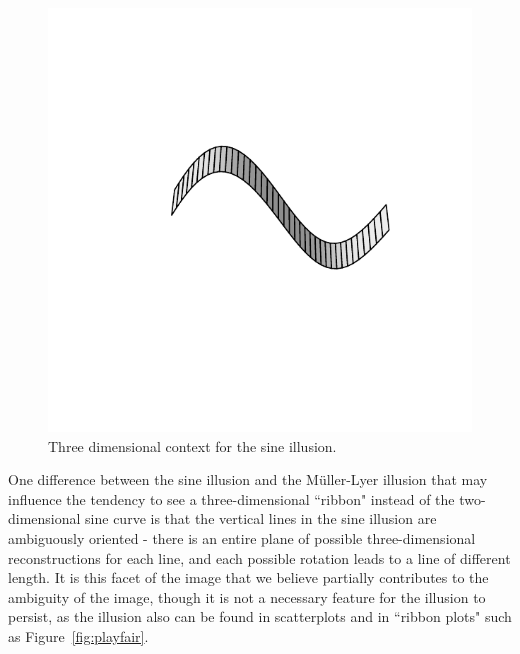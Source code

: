 \documentclass[journal]{vgtc}\usepackage{graphicx, color}
\begin{document}
\begin{figure}[h!t]\centering
\includegraphics[keepaspectratio=TRUE,width=\linewidth, trim=0in 1.5in 0in 1.5in]{figure/fig-sinedemo2}
\caption{Three dimensional context for the sine illusion.}\label{fig:sineillusion3d}
\end{figure}

One difference between the sine illusion and the M\"uller-Lyer illusion that may influence the tendency to see a three-dimensional ``ribbon" instead of the two-dimensional sine curve is that the vertical lines in the sine illusion are ambiguously oriented - there is an entire plane of possible three-dimensional reconstructions for each line, and each possible rotation leads to a line of different length. It is this facet of the image that we believe partially contributes to the ambiguity of the image, though it is not a necessary feature for the illusion to persist, as the illusion also can be found in scatterplots and in ``ribbon plots" such as Figure~\ref{fig:playfair}. 
\end{document}
